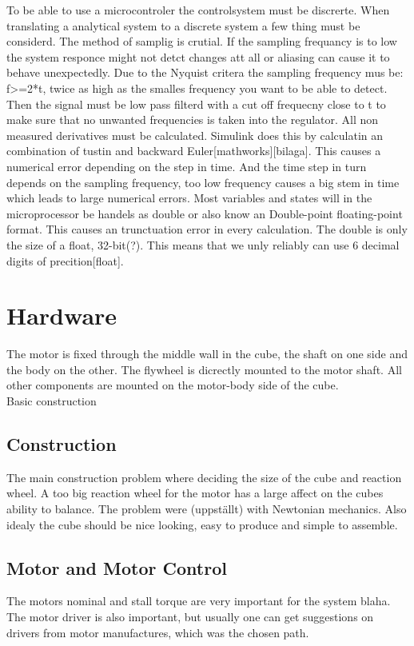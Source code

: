 \documentclass[a4paper,11pt]{kth-mag}
\begin{document}
To be able to use a microcontroler the controlsystem must be discrerte. When translating a analytical system to a 
discrete system a few thing must be considerd. The method of samplig is crutial. If the sampling frequancy is to 
low the system responce might not detct changes att all or aliasing can cause it to behave unexpectedly. Due to the 
Nyquist critera the sampling frequency mus be: f>=2*t, twice as high as the smalles frequency you want to be able to
detect. Then the signal must be low pass filterd with a cut off frequecny close to t to make sure that no unwanted
frequencies is taken into the regulator.
All non measured derivatives must be calculated. Simulink does this by calculatin an combination of tustin and 
backward Euler[mathworks][bilaga]. This causes a numerical error depending on the step in time. And the time step
in turn depends on the sampling frequency, too low frequency causes a big stem in time which leads to large numerical 
errors.
Most variables and states will in the microprocessor be handels as double or also know an Double-point floating-point
format. This causes an trunctuation error in every calculation. The double is only the size of a float, 32-bit(?). This
means that we unly reliably can use 6 decimal digits of precition[float].

\section{Hardware}
The motor is fixed through the middle wall in the cube, the shaft on one side and the body on the other. The flywheel is dicrectly mounted to the motor shaft. All other components are mounted on the motor-body side of the cube.
\\ Basic construction

\subsection{Construction}
The main construction problem where deciding the size of the cube and reaction wheel. A too big reaction wheel for the motor has a large affect on the cubes ability to balance. The problem were (uppställt) with Newtonian mechanics.
Also idealy the cube should be nice looking, easy to produce and simple to assemble. 
 
\subsection{Motor and Motor Control}
The motors nominal and stall torque are very important for the system blaha. The motor driver is also important, but usually one can get suggestions on drivers from motor manufactures, which was the chosen path.
  
\end{document}

